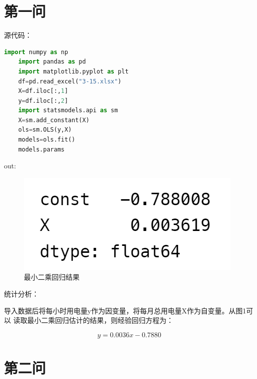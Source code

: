 \documentclass[a4paper,12pt]{article}
\begin{document}
\section{第一问}
源代码：
\begin{lstlisting}[language=python,breaklines]
	import numpy as np
	import pandas as pd
	import matplotlib.pyplot as plt
	df=pd.read_excel("3-15.xlsx")
	X=df.iloc[:,1]
	y=df.iloc[:,2]
	import statsmodels.api as sm
	X=sm.add_constant(X)
	ols=sm.OLS(y,X)
	models=ols.fit()
	models.params
\end{lstlisting}
out: 
\begin{figure}[htbp]
	\centering
	\includegraphics[scale=0.6]{out1.png}
	\caption{最小二乘回归结果}
\end{figure}

统计分析：

导入数据后将每小时用电量y作为因变量，将每月总用电量X作为自变量。从图1可以
读取最小二乘回归估计的结果，则经验回归方程为：

$$y=0.0036x-0.7880$$

\section{第二问}
\end{document}
